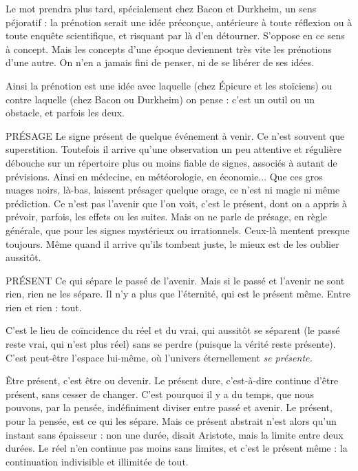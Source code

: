 Le mot prendra plus tard, spécialement chez Bacon et Durkheim, un sens
péjoratif : la prénotion serait une idée préconçue, antérieure à toute réflexion
ou à toute enquête scientifique, et risquant par là d’en détourner. S’oppose en
ce sens à concept. Mais les concepts d’une époque deviennent très vite les prénotions
d’une autre. On n’en a jamais fini de penser, ni de se libérer de ses
idées.

Ainsi la prénotion est une idée avec laquelle (chez Épicure et les stoïciens)
ou contre laquelle (chez Bacon ou Durkheim) on pense : c’est un outil ou un
obstacle, et parfois les deux.

PRÉSAGE Le signe présent de quelque événement à venir. Ce n’est souvent
que superstition. Toutefois il arrive qu’une observation un peu
attentive et régulière débouche sur un répertoire plus ou moins fiable de signes,
associés à autant de prévisions. Ainsi en médecine, en météorologie, en économie...
Que ces gros nuages noirs, là-bas, laissent présager quelque orage, ce
n’est ni magie ni même prédiction. Ce n’est pas l’avenir que l’on voit, c’est le
présent, dont on a appris à prévoir, parfois, les effets ou les suites. Mais on ne
parle de présage, en règle générale, que pour les signes mystérieux ou irrationnels.
Ceux-là mentent presque toujours. Même quand il arrive qu’ils tombent
juste, le mieux est de les oublier aussitôt.

PRÉSENT Ce qui sépare le passé de l’avenir. Mais si le passé et l’avenir ne
sont rien, rien ne les sépare. Il n’y a plus que l'éternité, qui est le
présent même. Entre rien et rien : tout.

C’est le lieu de coïncidence du réel et du vrai, qui aussitôt se séparent (le
passé reste vrai, qui n'est plus réel) sans se perdre (puisque la vérité reste présente).
C’est peut-être l’espace lui-même, où l'univers éternellement {\it se présente.}

Être présent, c’est être ou devenir. Le présent dure, c’est-à-dire continue
d’être présent, sans cesser de changer. C’est pourquoi il y a du temps, que nous
pouvons, par la pensée, indéfiniment diviser entre passé et avenir. Le présent,
pour la pensée, est ce qui les sépare. Mais ce présent abstrait n’est alors qu’un
instant sans épaisseur : non une durée, disait Aristote, mais la limite entre deux
durées. Le réel n’en continue pas moins sans limites, et c’est le présent même :
la continuation indivisible et illimitée de tout.

